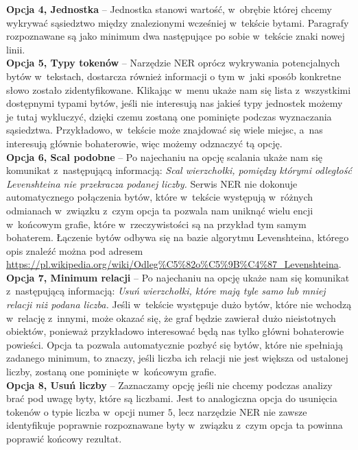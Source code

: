 \documentclass[12pt, a4paper]{article}
\begin{document}
\noindent\textbf{Opcja 4, Jednostka} -- Jednostka stanowi wartość, w~obrębie której chcemy wykrywać sąsiedztwo między znalezionymi wcześniej w~tekście bytami. Paragrafy rozpoznawane są jako minimum dwa następujące po sobie w~tekście znaki nowej linii.\\

\noindent\textbf{Opcja 5, Typy tokenów} -- Narzędzie NER oprócz wykrywania potencjalnych bytów w~tekstach, dostarcza również informacji o tym w~jaki sposób konkretne słowo zostało zidentyfikowane. Klikając w~menu ukaże nam się lista z~wszystkimi dostępnymi typami bytów, jeśli nie interesują nas jakieś typy jednostek możemy je tutaj wykluczyć, dzięki czemu zostaną one pominięte podczas wyznaczania sąsiedztwa. Przykładowo, w~tekście może znajdować się wiele miejsc, a~nas interesują głównie bohaterowie, więc możemy odznaczyć tą opcję.\\

\noindent\textbf{Opcja 6, Scal podobne} -- Po najechaniu na opcję scalania ukaże nam się komunikat z~następującą informacją: \textit{Scal wierzchołki, pomiędzy którymi odległość Levenshteina nie przekracza podanej liczby.} Serwis NER nie dokonuje automatycznego połączenia bytów, które w~tekście występują w~różnych odmianach w~związku z~czym opcja ta pozwala nam uniknąć wielu encji w~końcowym grafie, które w~rzeczywistości są na przykład tym samym bohaterem. Łączenie bytów odbywa się na bazie algorytmu Levenshteina, którego opis znaleźć można pod adresem \url{https://pl.wikipedia.org/wiki/Odleg\%C5\%82o\%C5\%9B\%C4\%87_Levenshteina}.\\

\noindent\textbf{Opcja 7, Minimum relacji} -- Po najechaniu na opcję ukaże nam się komunikat z~następującą informacją: \textit{Usuń wierzchołki, które mają tyle samo lub mniej relacji niż podana liczba.} Jeśli w~tekście występuje dużo bytów, które nie wchodzą w~relację z~innymi, może okazać się, że graf będzie zawierał dużo nieistotnych obiektów, ponieważ przykładowo interesować będą nas tylko główni bohaterowie powieści. Opcja ta pozwala automatycznie pozbyć się bytów, które nie spełniają zadanego minimum, to znaczy, jeśli liczba ich relacji nie jest większa od ustalonej liczby, zostaną one pominięte w~końcowym grafie.\\

\noindent\textbf{Opcja 8, Usuń liczby} -- Zaznaczamy opcję jeśli nie chcemy podczas analizy brać pod uwagę byty, które są liczbami. Jest to analogiczna opcja do usunięcia tokenów o typie liczba w~opcji numer $5$, lecz narzędzie NER nie zawsze identyfikuje poprawnie rozpoznawane byty w~związku z~czym opcja ta powinna poprawić końcowy rezultat.\\
\end{document}
